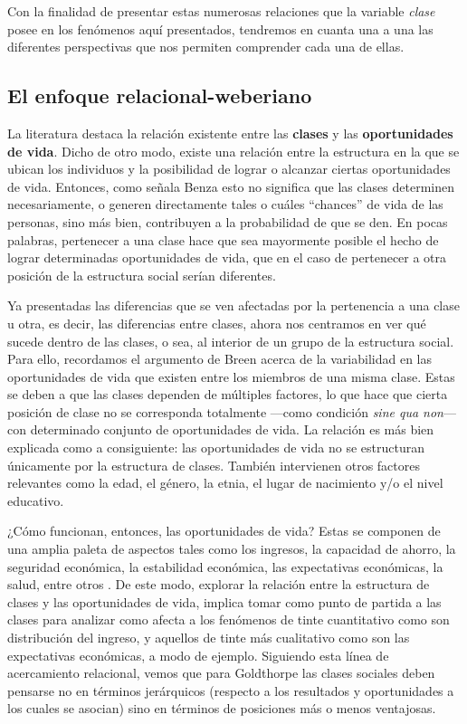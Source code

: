 \documentclass[
]{book}
\begin{document}
Con la finalidad de presentar estas numerosas relaciones que la variable \emph{clase} posee en los fenómenos aquí presentados, tendremos en cuanta una a una las diferentes perspectivas que nos permiten comprender cada una de ellas.

\hypertarget{el-enfoque-relacional-weberiano}{%
\subsection{El enfoque relacional-weberiano}\label{el-enfoque-relacional-weberiano}}

La literatura destaca la relación existente entre las \textbf{clases} y las \textbf{oportunidades de vida}. Dicho de otro modo, existe una relación entre la estructura en la que se ubican los individuos y la posibilidad de lograr o alcanzar ciertas oportunidades de vida. Entonces, como señala Benza \citeyearpar{Benza2014} esto no significa que las clases determinen necesariamente, o generen directamente tales o cuáles ``chances'' de vida de las personas, sino más bien, contribuyen a la probabilidad de que se den. En pocas palabras, pertenecer a una clase hace que sea mayormente posible el hecho de lograr determinadas oportunidades de vida, que en el caso de pertenecer a otra posición de la estructura social serían diferentes.

Ya presentadas las diferencias que se ven afectadas por la pertenencia a una clase u otra, es decir, las diferencias entre clases, ahora nos centramos en ver qué sucede dentro de las clases, o sea, al interior de un grupo de la estructura social. Para ello, recordamos el argumento de Breen \citeyearpar[pp.~3]{Breen2005} acerca de la variabilidad en las oportunidades de vida que existen entre los miembros de una misma clase. Estas se deben a que las clases dependen de múltiples factores, lo que hace que cierta posición de clase no se corresponda totalmente ---como condición \emph{sine qua non}--- con determinado conjunto de oportunidades de vida. La relación es más bien explicada como a consiguiente: las oportunidades de vida no se estructuran únicamente por la estructura de clases. También intervienen otros factores relevantes como la edad, el género, la etnia, el lugar de nacimiento y/o el nivel educativo.

¿Cómo funcionan, entonces, las oportunidades de vida? Estas se componen de una amplia paleta de aspectos tales como los ingresos, la capacidad de ahorro, la seguridad económica, la estabilidad económica, las expectativas económicas, la salud, entre otros \citep{Chan.Goldthorpe2007, Goldthorpe.McKnight2006}. De este modo, explorar la relación entre la estructura de clases y las oportunidades de vida, implica tomar como punto de partida a las clases para analizar como afecta a los fenómenos de tinte cuantitativo como son distribución del ingreso, y aquellos de tinte más cualitativo como son las expectativas económicas, a modo de ejemplo. Siguiendo esta línea de acercamiento relacional, vemos que para Goldthorpe las clases sociales deben pensarse no en términos jerárquicos (respecto a los resultados y oportunidades a los cuales se asocian) sino en términos de posiciones más o menos ventajosas.
\end{document}
